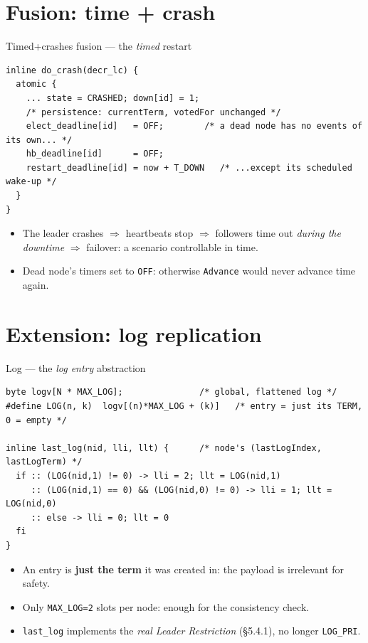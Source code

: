 \documentclass{beamer}
\begin{document}
\section{Fusion: time + crash}

\begin{frame}[fragile]{Timed+crashes fusion — the \emph{timed} restart}
\begin{lstlisting}[style=promela]
inline do_crash(decr_lc) {
  atomic {
    ... state = CRASHED; down[id] = 1;
    /* persistence: currentTerm, votedFor unchanged */
    elect_deadline[id]   = OFF;        /* a dead node has no events of its own... */
    hb_deadline[id]      = OFF;
    restart_deadline[id] = now + T_DOWN   /* ...except its scheduled wake-up */
  }
}
\end{lstlisting}
  \begin{itemize}
    \item The leader crashes $\Rightarrow$ heartbeats stop $\Rightarrow$ followers time out
          \emph{during the downtime} $\Rightarrow$ failover: a scenario controllable in time.
    \item Dead node's timers set to \texttt{OFF}: otherwise \texttt{Advance} would never advance time again.
  \end{itemize}
\end{frame}


\section{Extension: log replication}

\begin{frame}[fragile]{Log — the \emph{log entry} abstraction}
\begin{lstlisting}[style=promela]
byte logv[N * MAX_LOG];               /* global, flattened log */
#define LOG(n, k)  logv[(n)*MAX_LOG + (k)]   /* entry = just its TERM, 0 = empty */

inline last_log(nid, lli, llt) {      /* node's (lastLogIndex, lastLogTerm) */
  if :: (LOG(nid,1) != 0) -> lli = 2; llt = LOG(nid,1)
     :: (LOG(nid,1) == 0) && (LOG(nid,0) != 0) -> lli = 1; llt = LOG(nid,0)
     :: else -> lli = 0; llt = 0
  fi
}
\end{lstlisting}
  \begin{itemize}
    \item An entry is \textbf{just the term} it was created in: the payload is irrelevant for safety.
    \item Only \texttt{MAX\_LOG=2} slots per node: enough for the consistency check.
    \item \texttt{last\_log} implements the \emph{real Leader Restriction} (§5.4.1), no longer \texttt{LOG\_PRI}.
  \end{itemize}
\end{frame}
\end{document}
